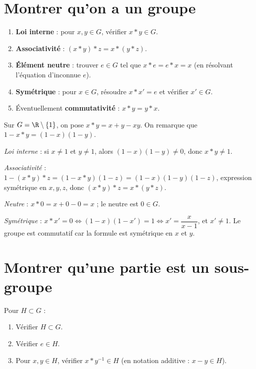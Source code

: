 
\section{Montrer qu'on a un groupe}

\begin{methode}
\begin{enumerate}[label=\textbf{Étape \arabic*.}]
  \item \textbf{Loi interne} : pour $x,y\in G$, vérifier $x*y\in G$.
  \item \textbf{Associativité} : $(x*y)*z=x*(y*z)$.
  \item \textbf{Élément neutre} : trouver $e\in G$ tel que $x*e=e*x=x$ (en résolvant l'équation d'inconnue $e$).
  \item \textbf{Symétrique} : pour $x\in G$, résoudre $x*x'=e$ et vérifier $x'\in G$.
  \item Éventuellement \textbf{commutativité} : $x*y=y*x$.
\end{enumerate}
\end{methode}

\begin{exemple}
Sur $G=\R\setminus\{1\}$, on pose $x*y=x+y-xy$. On remarque que $1-x*y=(1-x)(1-y)$.

\emph{Loi interne} : si $x\ne1$ et $y\ne1$, alors $(1-x)(1-y)\ne0$, donc $x*y\ne1$.

\emph{Associativité} : $1-(x*y)*z=(1-x*y)(1-z)=(1-x)(1-y)(1-z)$, expression symétrique en $x,y,z$, donc $(x*y)*z=x*(y*z)$.

\emph{Neutre} : $x*0=x+0-0=x$ ; le neutre est $0\in G$.

\emph{Symétrique} : $x*x'=0\iff(1-x)(1-x')=1\iff x'=\dfrac{x}{x-1}$, et $x'\neq1$. Le groupe est commutatif car la formule est symétrique en $x$ et $y$.
\end{exemple}

\section{Montrer qu'une partie est un sous-groupe}

\begin{methode}
Pour $H\subset G$ :
\begin{enumerate}[label=\textbf{Étape \arabic*.}]
  \item Vérifier $H\subset G$.
  \item Vérifier $e\in H$.
  \item Pour $x,y\in H$, vérifier $x*y^{-1}\in H$ (en notation additive : $x-y\in H$).
\end{enumerate}
\end{methode}

